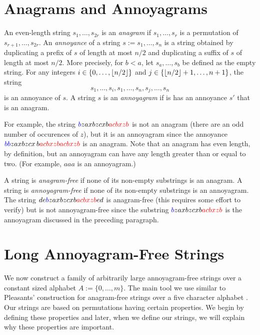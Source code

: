 \documentclass[kpfonts]{patmorin}
\newcommand{\colored}[2]{{\color{#1}#2}}
\begin{document}
\section{Anagrams and Annoyagrams}

An even-length string $s_1,\ldots,s_{2r}$ is an \emph{anagram} if $s_1,\ldots,s_r$ is a permutation of $s_{r+1},\ldots,s_{2r}$. An \emph{annoyance} of a string $s:=s_1,\ldots,s_n$ is a string obtained by duplicating a prefix of $s$ of length at most $n/2$ and duplicating a suffix of $s$ of length at most $n/2$.  More precisely, for $b <a$, let $s_a,\ldots,s_b$ be defined as the empty string.  For any integers $i\in\{0,\ldots,{\lfloor n/2 \rfloor}\}$ and $j\in\{{\lfloor n/2 \rfloor}+1,\ldots,n+1\}$, the string
\[
    s_1,\ldots,s_{i}, s_1,\ldots,s_n,s_{j},\ldots,s_n
\]
is an annoyance of $s$. A string $s$ is an \emph{annoyagram} if is has an annoyance $s'$ that is an anagram.

For example, the string $\colored{blue}{b}zaxbzcxb\colored{red}{acbxzb}$ is not an anagram (there are an odd number of occurences of $z$), but it is an annoyagram since the annoyance $\colored{blue}{bb}zaxbzcx\,b\colored{red}{acbxzb acbxzb}$ is an anagram.  Note that an anagram has even length, by definition, but an annoyagram can have any length greater than or equal to two. (For example, $aaa$ is an annoyagram.)

A string is \emph{anagram-free} if none of its non-empty substrings is an anagram. A string is \emph{annoyagram-free} if none of its non-empty substrings is an annoyagram. The string $de\colored{blue}{b}zaxbzcxb\colored{red}{acbxzb}ed$ is anagram-free (this requires some effort to verify) but is not annoyagram-free since the substring $\colored{blue}{b}zaxbzcxb\colored{red}{acbxzb}$ is the annoyagram discussed in the preceding paragraph.

\section{Long Annoyagram-Free Strings}

We now construct a family of arbitrarily large annoyagram-free strings over a constant sized alphabet $A:=\{0,\ldots,m\}$.  The main tool we use similar to Pleasants' construction for anagram-free strings over a five character alphabet \cite{pleasants:non-repetitive}.  Our strings are based on permutations having certain properties.  We begin by defining these properties and later, when we define our strings, we will explain why these properties are important.
\end{document}
